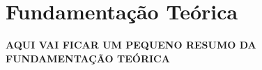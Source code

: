 \chapter[Fundamentação Teórica]{Fundamentação Teórica}
\label{cp:fundamentacao}

\textbf{AQUI VAI FICAR UM PEQUENO RESUMO DA FUNDAMENTAÇÃO TEÓRICA}

